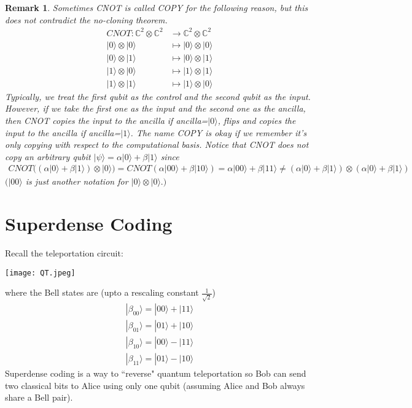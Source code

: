 \documentclass{article}
\newtheorem*{remark}{Remark}
\newcommand{\ket}[1]{|#1\rangle}
\begin{document}
\begin{remark}
    Sometimes CNOT is called COPY for the following reason, but this does not contradict the no-cloning theorem.
    \begin{align*} 
        CNOT: \mathbb{C}^2 \otimes \mathbb{C}^2 & \longrightarrow\mathbb{C}^2 \otimes \mathbb{C}^2\\
        \ket{0} \otimes \ket{0} &\longmapsto \ket{0} \otimes \ket{0} \\
        \ket{0} \otimes \ket{1} &\longmapsto \ket{0} \otimes \ket{1} \\
        \ket{1} \otimes \ket{0} &\longmapsto \ket{1} \otimes \ket{1} \\
        \ket{1} \otimes \ket{1} &\longmapsto \ket{1} \otimes \ket{0} 
    \end{align*}
    Typically, we treat the first qubit as the control and the second qubit as the input. However, if we take the first one as the input and the second one as the ancilla, then CNOT copies the input to the ancilla if ancilla=$\ket{0}$, flips and copies the input to the ancilla if ancilla=$\ket{1}$.
    The name COPY is okay if we remember it's only copying with respect to the computational basis. Notice that CNOT does not copy an arbitrary qubit $\ket{\psi}=\alpha \ket{0}+ \beta \ket{1}$ since
    \begin{align*}
        CNOT((\alpha \ket{0}+ \beta \ket{1}) \otimes \ket{0})=CNOT(\alpha\ket{00}+\beta\ket{10})=\alpha\ket{00}+\beta\ket{11}\neq (\alpha \ket{0}+ \beta \ket{1}) \otimes (\alpha \ket{0}+ \beta \ket{1})
    \end{align*}
    $(\ket{00}$ is just another notation for $\ket{0} \otimes \ket{0}.)$
\end{remark}
 
\section{Superdense Coding}
Recall the teleportation circuit:
\begin{center}
    \texttt{[image: QT.jpeg]}   
\end{center}

where the Bell states are (upto a rescaling constant $\frac{1}{\sqrt{2}}$)
\begin{align*}
    \ket{\beta_{00}}=\ket{00} + \ket{11}\\
    \ket{\beta_{01}}=\ket{01} + \ket{10}\\
    \ket{\beta_{10}}=\ket{00} - \ket{11}\\
    \ket{\beta_{11}}=\ket{01} - \ket{10}
\end{align*}
Superdense coding is a way to ``reverse" quantum teleportation so Bob can send two classical bits to Alice using only one qubit (assuming Alice and Bob always share a Bell pair).
\end{document}
